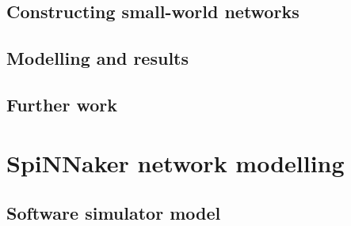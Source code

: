 		
		\subsection{Constructing small-world networks}
			
		
		\subsection{Modelling and results}
			
		
		\subsection{Further work}
			
	
	
	\section{SpiNNaker network modelling}
		
		
		\subsection{Software simulator model}
			
		
